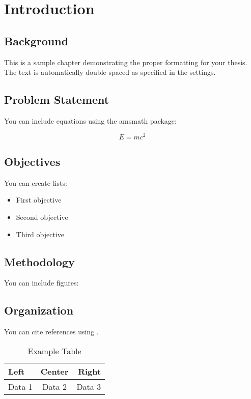 \chapter{Introduction}

\section{Background}
This is a sample chapter demonstrating the proper formatting for your thesis.
The text is automatically double-spaced as specified in the settings.

\section{Problem Statement}
You can include equations using the amsmath package:

\begin{equation}
    E = mc^2
\end{equation}

\section{Objectives}
You can create lists:

\begin{itemize}
    \item First objective
    \item Second objective
    \item Third objective
\end{itemize}

\section{Methodology}
You can include figures:


\section{Organization}
You can cite references using \cite{reference-key}.

\begin{table}[htbp]
    \centering
    \caption{Example Table}
    \label{tab:example}
    \begin{tabular}{|l|c|r|}
        \hline
        Left & Center & Right \\
        \hline
        Data 1 & Data 2 & Data 3 \\
        \hline
    \end{tabular}
\end{table} 